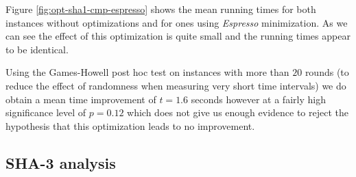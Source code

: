 Figure \ref{fig:opt-sha1-cmp-espresso} shows the mean running times for both instances without optimizations and for ones using \emph{Espresso} minimization.
As we can see the effect of this optimization is quite small and the running times appear to be identical.

%

Using the Games-Howell post hoc test on instances with more than $20$ rounds (to reduce the effect of randomness when measuring very short time intervals) we do obtain a mean time improvement of $t=1.6$ seconds however at a fairly high significance level of $p=0.12$ which does not give us enough evidence to reject the hypothesis that this optimization leads to no improvement.

\subsection{SHA-3 analysis} 
\label{sec:sha3-espresso}

